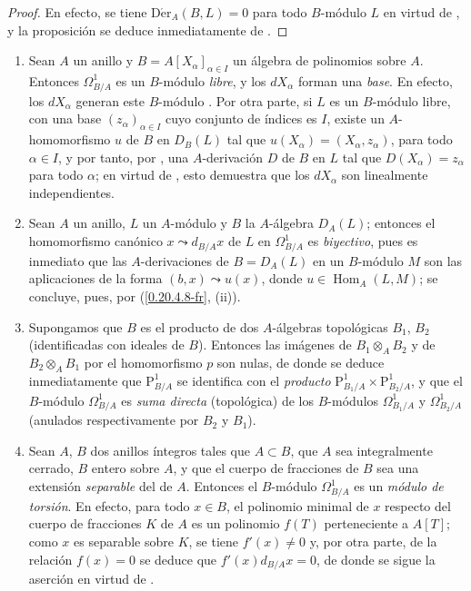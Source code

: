 \begin{proof}
En efecto, se tiene $\operatorname{D\acute{e}r}_A(B,L)=0$ para todo $B$-módulo
$L$ en virtud de , y la proposición se deduce inmediatamente
de .
\end{proof}

\begin{examples}[20.4.13]
\label{0.20.4.13-fr}
\begin{enumerate}
  \item[\rm(i)] Sean $A$ un anillo y
  $B=A[X_\alpha]_{\alpha\in I}$ un álgebra de polinomios sobre $A$. Entonces
  $\Omega^1_{B/A}$ es un $B$-módulo \emph{libre}, y los $dX_\alpha$ forman una
  \emph{base}. En efecto, los $dX_\alpha$ generan este $B$-módulo
  . Por otra parte, si $L$ es un $B$-módulo libre, con
  una base $(z_\alpha)_{\alpha\in I}$ cuyo conjunto de índices es $I$, existe
  un $A$-homomorfismo $u$ de $B$ en $D_B(L)$ tal que
  $u(X_\alpha)=(X_\alpha,z_\alpha)$, para todo $\alpha\in I$, y por tanto, por
  , una $A$-derivación $D$ de $B$ en $L$ tal que
  $D(X_\alpha)=z_\alpha$ para todo $\alpha$; en virtud de
  , esto demuestra que los $dX_\alpha$ son linealmente
  independientes.
  \item[\rm(ii)] Sean $A$ un anillo, $L$ un $A$-módulo y $B$ la
  $A$-álgebra $D_A(L)$; entonces el homomorfismo canónico
  $x\leadsto d_{B/A}x$ de $L$ en $\Omega^1_{B/A}$ es \emph{biyectivo}, pues
  es inmediato que las $A$-derivaciones de $B=D_A(L)$ en un $B$-módulo
  $M$ son las aplicaciones de la forma $(b,x)\leadsto u(x)$, donde
  $u\in\operatorname{Hom}_A(L,M)$; se concluye, pues, por
  (\ref{0.20.4.8-fr}, (ii)).
  \item[\rm(iii)] Supongamos que $B$ es el producto de dos $A$-álgebras
  topológicas $B_1$, $B_2$ (identificadas con ideales de $B$). Entonces las
  imágenes de $B_1\otimes_A B_2$ y de $B_2\otimes_A B_1$ por el homomorfismo
  $p$  son nulas, de donde se deduce inmediatamente que
  $\mathrm{P}^1_{B/A}$ se identifica con el \emph{producto}
  $\mathrm{P}^1_{B_1/A}\times\mathrm{P}^1_{B_2/A}$, y que el $B$-módulo
  $\Omega^1_{B/A}$ es \emph{suma directa} (topológica) de los $B$-módulos
  $\Omega^1_{B_1/A}$ y $\Omega^1_{B_2/A}$ (anulados respectivamente por
  $B_2$ y $B_1$).
  \item[\rm(iv)] Sean $A$, $B$ dos anillos íntegros tales que $A\subset
  B$, que $A$ sea integralmente cerrado, $B$ entero sobre $A$, y que el cuerpo
  de fracciones de $B$ sea una extensión \emph{separable} del de $A$. Entonces
  el $B$-módulo $\Omega^1_{B/A}$ es un \emph{módulo de torsión}. En efecto,
  para todo $x\in B$, el polinomio minimal de $x$ respecto del cuerpo de
  fracciones $K$ de $A$ es un polinomio $f(T)$ perteneciente a $A[T]$; como
  $x$ es separable sobre $K$, se tiene $f'(x)\neq0$ y, por otra parte, de
  la relación $f(x)=0$ se deduce que $f'(x)d_{B/A}x=0$, de donde se sigue
  la aserción en virtud de .
\end{enumerate}
\end{examples}

